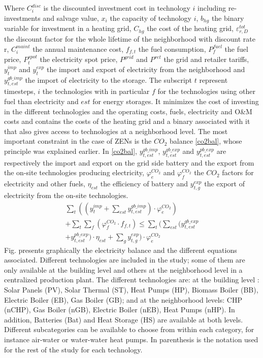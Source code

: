 \documentclass[conference]{IEEEtran}
\begin{document}
Where $C_i^{disc}$ is the discounted investment cost in technology $i$ including re-investments and salvage value, $x_i$ the capacity of technology $i$, $b_{hg}$ the binary variable for investment in a heating grid, $C_{hg}$ the cost of the heating grid, $\varepsilon^{tot}_{r,D}$ the discount factor for the whole lifetime of the neighborhood with discount rate r, $C_i^{maint}$ the annual maintenance cost, $f_{f,t}$ the fuel consumption, $P_{f}^{fuel}$ the fuel price, $P_{t}^{spot}$ the electricity spot price, $P^{grid}$ and $P^{ret}$ the grid and retailer tariffs, $y_{t}^{imp}$ and $y_{t}^{exp}$ the import and export of electricity from the neighborhood and $y_{t,est}^{gb\_imp}$ the import of electricity to the storage. The subscript $t$ represent timesteps, $i$ the technologies with in particular $f$ for the technologies using other fuel than electricity and $est$ for energy storages.
It minimizes the cost of investing in the different technologies and the operating costs, fuels, electricity and O\&M costs and contains the costs of the heating grid and a binary associated with it that also gives access to technologies at a neighborhood level.
The most important constraint in the case of ZENs is the $CO_2$ balance \eqref{co2bal}, whose principle was explained earlier. In \eqref{co2bal}, $y_{t,est}^{gb\_imp}$, $y_{t,est}^{gb\_exp}$ and $y_{t,est}^{pb\_exp}$ are respectively the import and export on the grid side battery and the export from the on-site technologies producing electricity, $\varphi^{CO_2}_{e}$ and $\varphi^{CO_2}_{f}$ the $CO_2$ factors for electricity and other fuels, $\eta_{est}$ the efficiency of battery and $y_{t,g}^{exp}$ the export of electricity from the on-site technologies.
\begin{multline}
    \sum_{t}((y_{t}^{imp}+\sum_{est}y_{t,est}^{gb\_imp}) \cdot \varphi^{CO_2}_{e}) \\+ \sum_{t}\sum_{f} (\varphi^{CO_2}_{f} \cdot f_{f,t}) \leq \sum_{t}(\sum_{est}(y_{t,est}^{gb\_exp}\\+y_{t,est}^{pb\_exp})\cdot \eta_{est} +\sum_{g}y_{t,g}^{exp}) \cdot \varphi^{CO_2}_{e}
\end{multline}
Fig.  presents graphically the electricity balance and the different equations associated.
Different technologies are included in the study; some of them are only available at the building level and others at the neighborhood level in a centralized production plant. The different technologies are: at the building level : Solar Panels (PV), Solar Thermal (ST), Heat Pumps (HP), Biomass Boiler (BB), Electric Boiler (EB), Gas Boiler (GB); and at the neighborhood levels: CHP (nCHP), Gas Boiler (nGB), Electric Boiler (nEB), Heat Pumps (nHP). In addition, Batteries (Bat) and Heat Storage (HS) are available at both levels. Different subcategories can be available to choose from within each category, for instance air-water or water-water heat pumps. In parenthesis is the notation used for the rest of the study for each technology.
\end{document}

